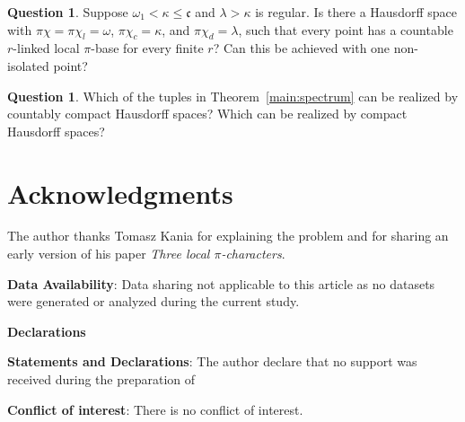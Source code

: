 \documentclass[11pt,a4paper]{amsart}
\theoremstyle{definition}
\newtheorem{question}[theorem]{Question}
\theoremstyle{remark}
\newcommand{\cont}{\mathfrak c}
\newcommand{\pc}{\pi\chi}
\newcommand{\pcl}{\pi\chi_l}
\newcommand{\pcc}{\pi\chi_c}
\newcommand{\pcd}{\pi\chi_d}
\begin{document}
\begin{question}
Suppose $\omega_1<\kappa\leqslant\cont$ and $\lambda>\kappa$ is regular. Is there a Hausdorff space with $\pc=\pcl=\omega$, $\pcc=\kappa$, and $\pcd=\lambda$, such that every point has a countable $r$-linked local $\pi$-base for every finite $r$? Can this be achieved with one non-isolated point?
\end{question}

\begin{question}
Which of the tuples in Theorem~\ref{main:spectrum} can be realized by countably compact Hausdorff spaces? Which can be realized by compact Hausdorff spaces?
\end{question}

\section*{Acknowledgments}
The author thanks Tomasz Kania for explaining the problem and for sharing an early version of his paper \emph{Three local $\pi$-characters}.

\bigskip\bigskip


\textbf{Data Availability}:  Data sharing not applicable to this article as no datasets were generated or analyzed during
the current study.



\textbf{Declarations}

\bigskip\bigskip


\textbf{Statements and Declarations}:  The author declare that no support was received during the preparation of

\textbf{Conflict of interest}: There is no conflict of interest.
\end{document}
